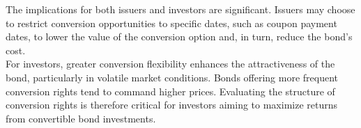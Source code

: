 The implications for both issuers and investors are significant. Issuers may choose to restrict conversion opportunities to specific dates, such as coupon payment dates, to lower the value of the conversion option and, in turn, reduce the bond’s cost. \\

For investors, greater conversion flexibility enhances the attractiveness of the bond, particularly in volatile market conditions. Bonds offering more frequent conversion rights tend to command higher prices. Evaluating the structure of conversion rights is therefore critical for investors aiming to maximize returns from convertible bond investments.\\